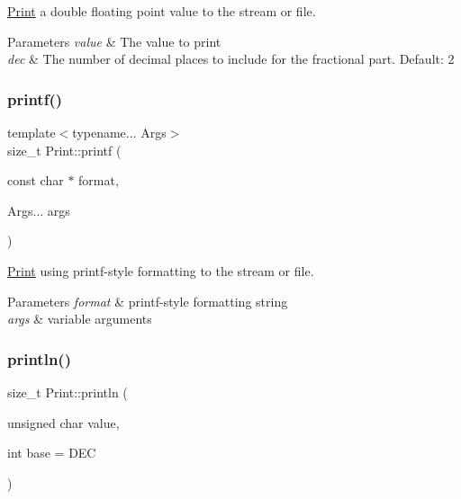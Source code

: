 \mbox{\hyperlink{class_print}{Print}} a double floating point value to the stream or file. 


\begin{DoxyParams}{Parameters}
{\em value} & The value to print \\
\hline
{\em dec} & The number of decimal places to include for the fractional part. Default\+: 2 \\
\hline
\end{DoxyParams}
\mbox{\label{class_print_a08a461c9fee5fd8f5795d6e9f61e3d5b}} 
\subsubsection{\texorpdfstring{printf()}{printf()}}
{\footnotesize\ttfamily template$<$typename... Args$>$ \\
size\+\_\+t Print\+::printf (\begin{DoxyParamCaption}\item[{const char $\ast$}]{format,  }\item[{Args...}]{args }\end{DoxyParamCaption})\hspace{0.3cm}{\ttfamily [inline]}}



\mbox{\hyperlink{class_print}{Print}} using printf-\/style formatting to the stream or file. 


\begin{DoxyParams}{Parameters}
{\em format} & printf-\/style formatting string\\
\hline
{\em args} & variable arguments \\
\hline
\end{DoxyParams}
\mbox{\label{class_print_a000b3fd5b723cb6c7db0d3231a9ef2f8}} 
\subsubsection{\texorpdfstring{println()}{println()}\hspace{0.1cm}{\footnotesize\ttfamily [1/6]}}
{\footnotesize\ttfamily size\+\_\+t Print\+::println (\begin{DoxyParamCaption}\item[{unsigned char}]{value,  }\item[{int}]{base = {\ttfamily DEC} }\end{DoxyParamCaption})}



